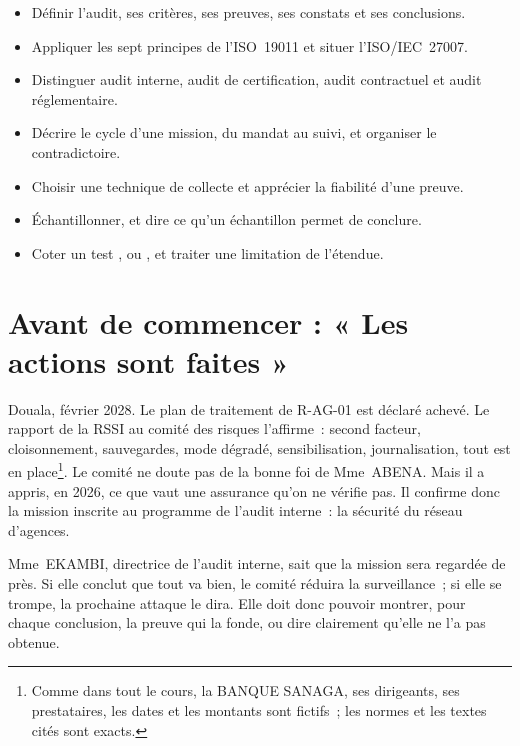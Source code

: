 \begin{boxobjectifs}
\begin{itemize}
    \item Définir l'audit, ses critères, ses preuves, ses constats et ses
          conclusions.
    \item Appliquer les sept principes de l'ISO~19011 et situer
          l'ISO/IEC~27007.
    \item Distinguer audit interne, audit de certification, audit
          contractuel et audit réglementaire.
    \item Décrire le cycle d'une mission, du mandat au suivi, et organiser
          le contradictoire.
    \item Choisir une technique de collecte et apprécier la fiabilité d'une
          preuve.
    \item Échantillonner, et dire ce qu'un échantillon permet de conclure.
    \item Coter un test \OUI{}, \NON{} ou \NEK{}, et traiter une limitation
          de l'étendue.
\end{itemize}
\end{boxobjectifs}

\bigskip

\section*{Avant de commencer : « Les actions sont faites »}

Douala, février 2028. Le plan de traitement de R-AG-01 est déclaré achevé.
Le rapport de la RSSI au comité des risques l'affirme~: second facteur,
cloisonnement, sauvegardes, mode dégradé, sensibilisation, journalisation,
tout est en place\footnote{Comme dans tout le cours, la BANQUE SANAGA, ses
dirigeants, ses prestataires, les dates et les montants sont fictifs~; les
normes et les textes cités sont exacts.}. Le comité ne doute pas de la
bonne foi de Mme~ABENA. Mais il a appris, en 2026, ce que vaut une
assurance qu'on ne vérifie pas. Il confirme donc la mission inscrite au
programme de l'audit interne~: la sécurité du réseau d'agences.

Mme~EKAMBI, directrice de l'audit interne, sait que la mission sera
regardée de près. Si elle conclut que tout va bien, le comité réduira la
surveillance~; si elle se trompe, la prochaine attaque le dira. Elle doit
donc pouvoir montrer, pour chaque conclusion, la preuve qui la fonde, ou
dire clairement qu'elle ne l'a pas obtenue.

